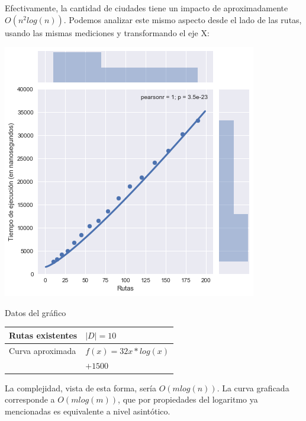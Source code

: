 Efectivamente, la cantidad de ciudades tiene un impacto de aproximadamente $O(n^2log(n))$. Podemos analizar este mismo aspecto desde el lado de las rutas, usando las mismas mediciones y transformando el eje X:

\noindent
\begin{minipage}{0.55\textwidth}
	\hfill
	\includegraphics[scale=0.60]{imagenes/ej3-1-bis.png}
\end{minipage}
\hfill
\begin{minipage}{0.44\textwidth}
	\begin{center}
		Datos del gráfico

		\begin{tabular}{ | l l |}
			\hline
			Rutas existentes & $| D | = 10$ \\ \hline
			Curva aproximada & $f(x) = 32 x * log(x) $ \\
			& $+ 1500$ \\
			\hline
		\end{tabular}
	\end{center}
\end{minipage}

La complejidad, vista de esta forma, sería $O(m log(n))$. La curva graficada corresponde a $O(m log(m))$, que por propiedades del logaritmo ya mencionadas es equivalente a nivel asintótico.

